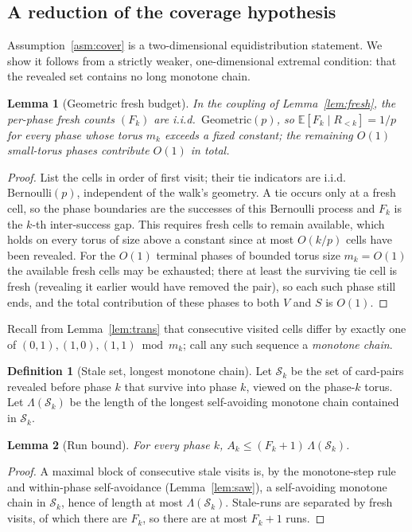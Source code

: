 \documentclass[11pt]{article}
\newtheorem{lemma}{Lemma}
\theoremstyle{definition}
\newtheorem{definition}{Definition}
\theoremstyle{remark}
\newcommand{\E}{\mathbb{E}}
\begin{document}
\subsection{A reduction of the coverage hypothesis}\label{sec:reduce}
Assumption~\ref{asm:cover} is a two-dimensional equidistribution statement. We show it follows from a strictly weaker,
one-dimensional extremal condition: that the revealed set contains no long monotone chain.

\begin{lemma}[Geometric fresh budget]\label{lem:geom}
In the coupling of Lemma~\ref{lem:fresh}, the per-phase fresh counts $(F_k)$ are i.i.d.\ $\mathrm{Geometric}(p)$, so
$\E[F_k \mid R_{<k}] = 1/p$ for every phase whose torus $m_k$ exceeds a fixed constant; the remaining $O(1)$ small-torus
phases contribute $O(1)$ in total.
\end{lemma}
\begin{proof}
List the cells in order of first visit; their tie indicators are i.i.d.\ $\mathrm{Bernoulli}(p)$, independent of the walk's
geometry. A tie occurs only at a fresh cell, so the phase boundaries are the successes of this Bernoulli process and $F_k$
is the $k$-th inter-success gap. This requires fresh cells to remain available, which holds on every torus of size above a
constant since at most $O(k/p)$ cells have been revealed. For the $O(1)$ terminal phases of bounded torus size $m_k = O(1)$
the available fresh cells may be exhausted; there at least the surviving tie cell is fresh (revealing it earlier would have
removed the pair), so each such phase still ends, and the total contribution of these phases to both $V$ and $S$ is $O(1)$.
\end{proof}

Recall from Lemma~\ref{lem:trans} that consecutive visited cells differ by exactly one of $(0,1), (1,0), (1,1) \bmod m_k$;
call any such sequence a \emph{monotone chain}.

\begin{definition}[Stale set, longest monotone chain]
Let $\mathcal S_k$ be the set of card-pairs revealed before phase $k$ that survive into phase $k$, viewed on the phase-$k$
torus. Let $\Lambda(\mathcal S_k)$ be the length of the longest self-avoiding monotone chain contained in $\mathcal S_k$.
\end{definition}

\begin{lemma}[Run bound]\label{lem:run}
For every phase $k$, $A_k \le (F_k + 1)\,\Lambda(\mathcal S_k)$.
\end{lemma}
\begin{proof}
A maximal block of consecutive stale visits is, by the monotone-step rule and within-phase self-avoidance
(Lemma~\ref{lem:saw}), a self-avoiding monotone chain in $\mathcal S_k$, hence of length at most
$\Lambda(\mathcal S_k)$. Stale-runs are separated by fresh visits, of which there are $F_k$, so there are at most
$F_k + 1$ runs.
\end{proof}
\end{document}
